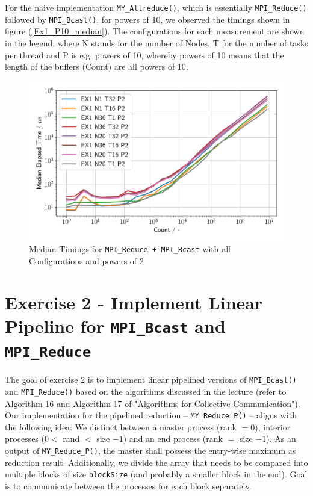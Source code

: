 For the naive implementation \texttt{MY\_Allreduce()}, which is essentially \texttt{MPI\_Reduce()} followed 
by \texttt{MPI\_Bcast()}, for powers of 10, we observed the timings shown in figure (\ref{Ex1_P10_median}).
The configurations for each measurement are shown in the legend, where N stands for the number of Nodes, T 
for the number of tasks per thread and P is e.g. powers of 10, whereby powers of 10 means that the length 
of the buffers (Count) are all powers of 10.
\begin{figure}[h]
    \begin{center}
        \includegraphics[width=0.8\linewidth]{figures/Ex1_2.pdf}
        \caption{Median Timings for \texttt{MPI\_Reduce + MPI\_Bcast} with all Configurations and powers of 2}
        \label{Ex1_P2_median}
    \end{center}
\end{figure}

\pagebreak

\section{Exercise 2 - Implement Linear Pipeline for \texttt{MPI\_Bcast} and \texttt{MPI\_Reduce}}

The goal of exercise 2 is to implement linear pipelined versions of \texttt{MPI\_Bcast()} and \texttt{MPI\_Reduce()} 
based on the algorithms discussed in the lecture (refer to Algorithm 16 and Algorithm 17 of "Algorithms for Collective 
Communication"). \\

Our implementation for the pipelined reduction -- \texttt{MY\_Reduce\_P()} – aligns with the following idea: We 
distinct between a master process (rank $= 0$), interior processes ($0 <$ rand $<$ size $-1$) and an end process 
(rank $=$ size $-1$). As an output of \texttt{MY\_Reduce\_P()}, the master shall possess the entry-wise maximum as 
reduction result. Additionally, we divide the array that needs to be compared into multiple blocks of size 
\texttt{blockSize} (and probably a smaller block in the end). Goal is to communicate between the processes for each 
block separately. \\


